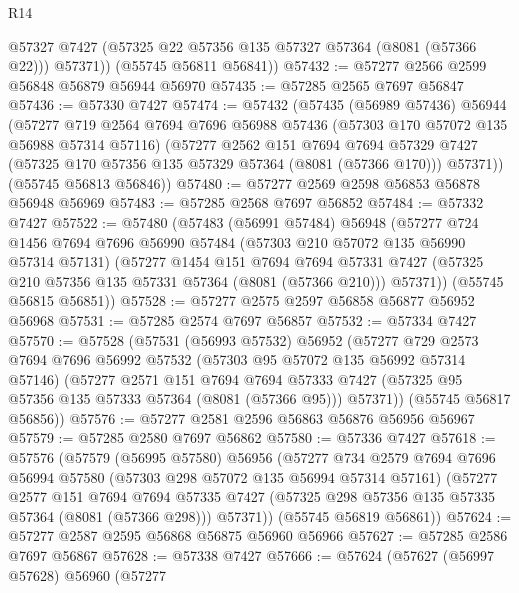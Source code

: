 \begin{lexlean}{R14}
\begin{coremodule}
          @57327
          @7427
          (@57325 @22 @57356 @135 @57327 @57364 (@8081 (@57366 @22)))
          @57371))
      (@55745 @56811 @56841))
@57432 := @57277 @2566 @2599 @56848 @56879 @56944 @56970
@57435 := @57285 @2565 @7697 @56847
@57436 := @57330 @7427
@57474 := @57432
    (@57435
      (@56989 @57436)
      @56944
      (@57277
        @719
        @2564
        @7694
        @7696
        @56988
        @57436
        (@57303 @170 @57072 @135 @56988 @57314 @57116)
        (@57277
          @2562
          @151
          @7694
          @7694
          @57329
          @7427
          (@57325 @170 @57356 @135 @57329 @57364 (@8081 (@57366 @170)))
          @57371))
      (@55745 @56813 @56846))
@57480 := @57277 @2569 @2598 @56853 @56878 @56948 @56969
@57483 := @57285 @2568 @7697 @56852
@57484 := @57332 @7427
@57522 := @57480
    (@57483
      (@56991 @57484)
      @56948
      (@57277
        @724
        @1456
        @7694
        @7696
        @56990
        @57484
        (@57303 @210 @57072 @135 @56990 @57314 @57131)
        (@57277
          @1454
          @151
          @7694
          @7694
          @57331
          @7427
          (@57325 @210 @57356 @135 @57331 @57364 (@8081 (@57366 @210)))
          @57371))
      (@55745 @56815 @56851))
@57528 := @57277 @2575 @2597 @56858 @56877 @56952 @56968
@57531 := @57285 @2574 @7697 @56857
@57532 := @57334 @7427
@57570 := @57528
    (@57531
      (@56993 @57532)
      @56952
      (@57277
        @729
        @2573
        @7694
        @7696
        @56992
        @57532
        (@57303 @95 @57072 @135 @56992 @57314 @57146)
        (@57277
          @2571
          @151
          @7694
          @7694
          @57333
          @7427
          (@57325 @95 @57356 @135 @57333 @57364 (@8081 (@57366 @95)))
          @57371))
      (@55745 @56817 @56856))
@57576 := @57277 @2581 @2596 @56863 @56876 @56956 @56967
@57579 := @57285 @2580 @7697 @56862
@57580 := @57336 @7427
@57618 := @57576
    (@57579
      (@56995 @57580)
      @56956
      (@57277
        @734
        @2579
        @7694
        @7696
        @56994
        @57580
        (@57303 @298 @57072 @135 @56994 @57314 @57161)
        (@57277
          @2577
          @151
          @7694
          @7694
          @57335
          @7427
          (@57325 @298 @57356 @135 @57335 @57364 (@8081 (@57366 @298)))
          @57371))
      (@55745 @56819 @56861))
@57624 := @57277 @2587 @2595 @56868 @56875 @56960 @56966
@57627 := @57285 @2586 @7697 @56867
@57628 := @57338 @7427
@57666 := @57624
    (@57627
      (@56997 @57628)
      @56960
      (@57277

\end{coremodule}
\end{lexlean}
